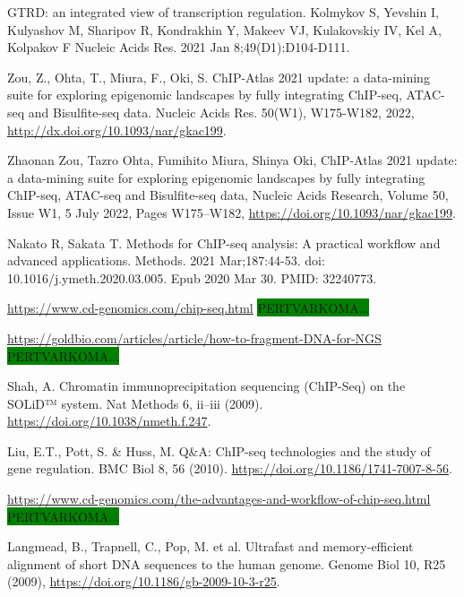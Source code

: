 \documentclass[12pt]{article}
\begin{document}

\begin{thebibliography}{99}

 GTRD: an integrated view of transcription regulation.
Kolmykov S, Yevshin I, Kulyashov M, Sharipov R, Kondrakhin Y, Makeev VJ,
Kulakovskiy IV, Kel A, Kolpakov F Nucleic Acids Res. 2021 Jan
8;49(D1):D104-D111.

 Zou, Z., Ohta, T., Miura, F., Oki, S. ChIP-Atlas 2021
update: a data-mining suite for exploring epigenomic landscapes by fully
integrating ChIP-seq, ATAC-seq and Bisulfite-seq data. Nucleic Acids Res.
50(W1), W175-W182, 2022, \newline
\url{http://dx.doi.org/10.1093/nar/gkac199}.

 Zhaonan Zou, Tazro Ohta, Fumihito Miura, Shinya Oki,
ChIP-Atlas 2021 update: a data-mining suite for exploring epigenomic landscapes
by fully integrating ChIP-seq, ATAC-seq and Bisulfite-seq data, Nucleic Acids
Research, Volume 50, Issue W1, 5 July 2022, Pages W175–W182,
\url{https://doi.org/10.1093/nar/gkac199}.

 Nakato R, Sakata T. Methods for ChIP-seq analysis: A
practical workflow and advanced applications. Methods. 2021 Mar;187:44-53.
doi: 10.1016/j.ymeth.2020.03.005. Epub 2020 Mar 30. PMID: 32240773.

 \url{https://www.cd-genomics.com/chip-seq.html}
\colorbox{green}{PERTVARKOMA...}

\url{https://goldbio.com/articles/article/how-to-fragment-DNA-for-NGS}
\colorbox{green}{PERTVARKOMA...}

 Shah, A. Chromatin immunoprecipitation sequencing (ChIP-Seq)
on the SOLiD™ system. Nat Methods 6, ii–iii (2009).
\url{https://doi.org/10.1038/nmeth.f.247}.

 Liu, E.T., Pott, S. \& Huss, M. Q\&A: ChIP-seq technologies
and the study of gene regulation. BMC Biol 8, 56 (2010).
\url{https://doi.org/10.1186/1741-7007-8-56}.

 \url{https://www.cd-genomics.com/the-advantages-and-workflow-of-chip-seq.html}
\colorbox{green}{PERTVARKOMA...}

 Langmead, B., Trapnell, C., Pop, M. et al. Ultrafast and
memory-efficient alignment of short DNA sequences to the human genome. Genome
Biol 10, R25 (2009), \newline
\url{https://doi.org/10.1186/gb-2009-10-3-r25}.


\end{thebibliography}
\end{document}
